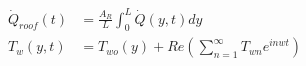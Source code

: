 \documentclass[preview,border=12pt,varwidth]{standalone}
\begin{document}
\begin{align}
  \tag{5.1} \label{eq:5.1}
    \dot{Q}_{roof}(t) &= \frac{A_R}{L} \int_{0}^{L} \dot{Q}(y,t) dy \\
  \tag{5.2} \label{eq:5.2}
    T_w(y,t) &= T_{wo}(y) + Re\left( \sum_{n=1}^{\infty} T_{wn} e^{inwt} \right)
\end{align}
\end{document}
